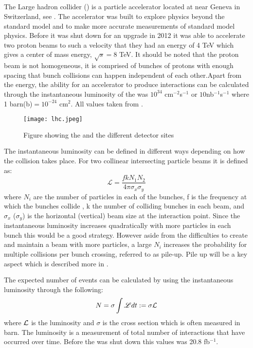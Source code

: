 \subsection{\abbrLHC}
The Large hadron collider (\abbrLHC) is a particle accelerator located at \abbrCERN near Geneva in Switzerland, see . The accelerator was built to explore physics beyond the standard model and to make more accurate measurements of standard model physics. Before it was shut down for an upgrade in 2012 it was able to accelerate two proton beams to such a velocity that they had an energy of 4 TeV which gives a center of mass energy, $\sqrt{s}=8$ TeV. It should be noted that the proton beam is not homogeneous, it is comprised of bunches of protons with enough spacing that bunch collisions can happen independent of each other.Apart from the energy, the ability for an accelerator to produce interactions can be calculated through the instantaneous luminosity of the \abbrLHC was $10^{34}$ cm$^{-2}$s$^{-1}$ or $10$nb$^{-1}$s$^{-1}$ where 1 barn(b)$=10^{-24}$ cm$^2$. All values taken from \citep{lumires}.
\begin{figure}[H]
\begin{center}
\texttt{[image: lhc.jpeg]}
\caption{Figure showing the \abbrLHC and the different detector sites\citep{lhcimage}}
\label{fig:lhc}
\end{center}
\end{figure}
The instantaneous luminosity can be defined in different ways depending on how the collision takes place. For two collinear intersecting particle beams it is defined as:
\begin{equation}
\mathscr{L} = \frac{fkN_1 N_2}{4\pi \sigma_x \sigma_y}
\end{equation}
where $N_i$ are the number of particles in each of the bunches, f is the frequency at which the bunches collide , k the number of colliding bunches in each beam, and $\sigma_x$ ($\sigma_y$) is the horizontal (vertical) beam size at the interaction point. Since the instantaneous luminosity increases quadratically with more particles in each bunch this would be a good strategy. However aside from the difficulties to create and maintain a beam with more particles, a large $N_i$ increases the probability for multiple collisions per bunch crossing, referred to as pile-up. Pile up will be a key aspect which is described more in . 

The expected number of events can be calculated by using the instantaneous luminosity through the following:
\begin{equation}
N=\sigma \int \mathscr{L} dt := \sigma \mathcal{L}
\end{equation}
where $\mathcal{L}$ is the luminosity and $\sigma$ is the cross section which is often measured in barn.
The luminosity is a measurement of total number of interactions that have occurred over time. Before the \abbrLHC was shut down this values was 20.8 fb$^{-1}$.

